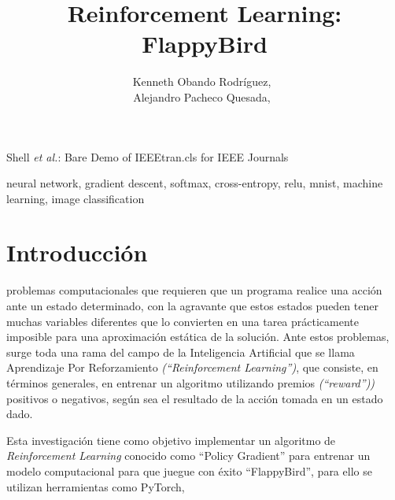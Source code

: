 \documentclass[journal]{IEEEtran}
\begin{document}
    \title{Reinforcement Learning:\\ FlappyBird}

    \author{Kenneth Obando Rodríguez,~\\
                Alejandro Pacheco Quesada,~}

        {Shell \MakeLowercase{\textit{et al.}}: Bare Demo of IEEEtran.cls for IEEE Journals}

    \maketitle

    
\begin{abstract}

\end{abstract}

\begin{IEEEkeywords}
neural network, gradient descent, softmax, cross-entropy, relu, mnist, machine learning, image classification
\end{IEEEkeywords}

\IEEEpeerreviewmaketitle


\section{Introducción}
     problemas computacionales que requieren que un programa realice una acción ante un estado determinado, con la agravante que estos estados pueden tener muchas variables diferentes que lo convierten en una tarea prácticamente imposible para una aproximación estática de la solución. Ante estos problemas, surge toda una rama del campo de la Inteligencia Artificial que se llama Aprendizaje Por Reforzamiento \emph{(``Reinforcement Learning'')}, que consiste, en términos generales, en entrenar un algoritmo utilizando premios \emph{(``reward''))} positivos o negativos, según sea el resultado de la acción tomada en un estado dado.

    Esta investigación tiene como objetivo implementar un algoritmo de \emph{Reinforcement Learning} conocido como ``Policy Gradient'' para entrenar un modelo computacional para que juegue con éxito ``FlappyBird'', para ello se utilizan herramientas como PyTorch, 
 
\end{document}
